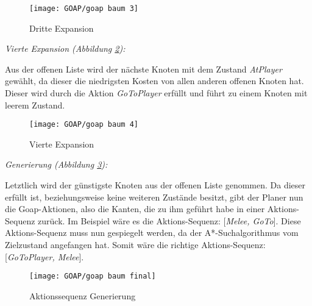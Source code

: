 \begin{figure}[h]
  \centering
  \texttt{[image: GOAP/goap baum 3]}
	\captionsetup{justification=justified, format=plain}
  \caption{Dritte Expansion}
  \label{fig:goap3}
\end{figure}

\clearpage

\textit{Vierte Expansion (Abbildung \ref{fig:goap4}):}

Aus der offenen Liste wird der n\"{a}chste Knoten mit dem Zustand \textit{AtPlayer} gew\"{a}hlt, da dieser die niedrigsten Kosten von allen anderen offenen Knoten hat. Dieser wird durch die Aktion \textit{GoToPlayer} erf\"{u}llt und f\"{u}hrt zu einem Knoten mit leerem Zustand.

\begin{figure}[h]
  \centering
  \texttt{[image: GOAP/goap baum 4]}
	\captionsetup{justification=justified, format=plain}
  \caption{Vierte Expansion}
  \label{fig:goap4}
\end{figure}

\clearpage

\textit{Generierung (Abbildung \ref{fig:goap5}):}

Letztlich wird der g\"{u}nstigste Knoten aus der offenen Liste genommen. Da dieser erf\"{u}llt ist, beziehungsweise keine weiteren Zust\"{a}nde besitzt, gibt der Planer nun die Goap-Aktionen, also die Kanten, die zu ihm gef\"{u}hrt habe in einer Aktions-Sequenz zur\"{u}ck. Im Beispiel w\"{a}re es die Aktions-Sequenz: [\textit{Melee, GoTo}]. Diese Aktions-Sequenz muss nun gespiegelt werden, da der A*-Suchalgorithmus vom Zielzustand angefangen hat. Somit w\"{a}re die richtige Aktions-Sequenz: [\textit{GoToPlayer, Melee}].

\begin{figure}[h]
  \centering
  \texttt{[image: GOAP/goap baum final]}
	\captionsetup{justification=justified, format=plain}
  \caption{Aktionssequenz Generierung}
  \label{fig:goap5}
\end{figure}
